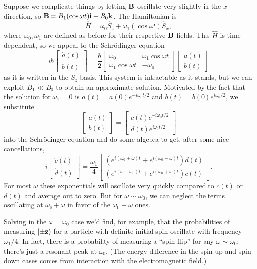 \documentclass[../p116main.tex]{subfiles}
\begin{document}
Suppose we complicate things by letting $\mathbf{B}$ oscillate very slightly in the $x$-direction, so $\mathbf{B} = B_1 (\cos \omega t) \mathbf{i} + B_0 \mathbf{k}$.
The Hamiltonian is
\[ \hat H = \omega_0 \hat S_z + \omega_1 (\cos \omega t) \hat S_x, \]
where $\omega_0, \omega_1$ are defined as before for their respective $\mathbf{B}$-fields.
This $\hat H$ is time-dependent, so we appeal to the Schrödinger equation
\[ i\hbar \begin{bmatrix} \dot a(t) \\ \dot b(t) \end{bmatrix} = \frac{\hbar}{2} \begin{bmatrix} \omega_0 & \omega_1 \cos \omega t \\ \omega_1 \cos \omega t & -\omega_0 \end{bmatrix} \begin{bmatrix} a(t) \\ b(t) \end{bmatrix} \]
as it is written in the $S_z$-basis.
This system is intractable as it stands, but we can exploit $B_1 \ll B_0$ to obtain an approximate solution.
Motivated by the fact that the solution for $\omega_1 = 0$ is $a(t) = a(0) e^{-i\omega_0 t / 2}$ and $b(t) = b(0) e^{i\omega_0 / 2}$, we substitute
\[ \begin{bmatrix} a(t) \\ b(t) \end{bmatrix} = \begin{bmatrix} c(t) e^{-i \omega_0 t / 2} \\ d(t) e^{i \omega_0 t / 2} \end{bmatrix} \]
into the Schrödinger equation and do some algebra to get, after some nice cancellations,
\[ i \begin{bmatrix} \dot c(t) \\ \dot d(t) \end{bmatrix} = \frac{\omega_1}{4} \begin{bmatrix} \left( e^{i (\omega_0 + \omega) t} + e^{i (\omega_0 - \omega) t} \right) d(t) \\ \left( e^{i (\omega - \omega_0) t} + e^{i (\omega_0 + \omega) t} \right) c(t) \end{bmatrix}. \]
For most $\omega$ these exponentials will oscillate very quickly compared to $c(t)$ or $d(t)$ and average out to zero.
But for $\omega \sim \omega_0$, we can neglect the terms oscillating at $\omega_0 + \omega$ in favor of the $\omega_0 - \omega$ ones.

Solving in the $\omega = \omega_0$ case we'd find, for example, that the probabilities of measuring $\left| \pm\mathbf{z} \right>$ for a particle with definite initial spin oscillate with frequency $\omega_1 / 4$.
In fact, there is a probability of measuring a ``spin flip'' for any $\omega \sim \omega_0$; there's just a resonant peak at $\omega_0$.
(The energy difference in the spin-up and spin-down cases comes from interaction with the electromagnetic field.)
\end{document}
